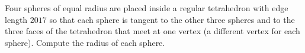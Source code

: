 Four spheres of equal radius are placed inside a regular tetrahedron with edge length $2017$ so that each sphere is tangent to the other three spheres and to the three faces of the tetrahedron that meet at one vertex (a different vertex for each sphere). Compute the radius of each sphere.
